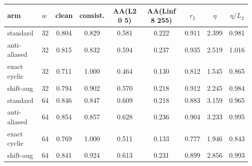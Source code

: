 \begin{tabular}{ll cc cc ccc}
\toprule
arm & $w$ & clean & consist. & AA(L2 0 5) & AA(Linf 8 255) & $r_2$ & $\eta$ & $\eta/L_2$ \\
\midrule
standard & 32 & 0.804 & 0.829 & 0.581 & 0.222 & 0.911 & 2.399 & 0.981 \\
anti-aliased & 32 & 0.815 & 0.832 & 0.594 & 0.237 & 0.935 & 2.519 & 1.016 \\
exact cyclic & 32 & 0.711 & 1.000 & 0.464 & 0.130 & 0.812 & 1.545 & 0.865 \\
shift-aug & 32 & 0.794 & 0.902 & 0.570 & 0.218 & 0.912 & 2.245 & 0.984 \\
\midrule
standard & 64 & 0.846 & 0.847 & 0.609 & 0.218 & 0.883 & 3.159 & 0.965 \\
anti-aliased & 64 & 0.854 & 0.857 & 0.628 & 0.236 & 0.904 & 3.233 & 0.995 \\
exact cyclic & 64 & 0.769 & 1.000 & 0.511 & 0.133 & 0.777 & 1.946 & 0.843 \\
shift-aug & 64 & 0.841 & 0.924 & 0.613 & 0.231 & 0.899 & 2.856 & 0.993 \\
\bottomrule
\end{tabular}
